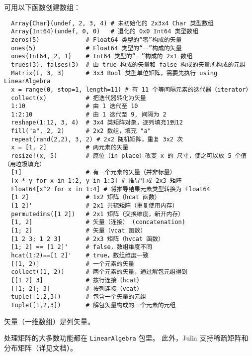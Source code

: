 \documentclass[10pt,a4paper]{article}
\begin{document}
可用以下函数创建数组：
\begin{lstlisting}
  Array{Char}(undef, 2, 3, 4) # 未初始化的 2x3x4 Char 类型数组
  Array{Int64}(undef, 0, 0)   # 退化的 0x0 Int64 类型数组
  zeros(5)             # Float64 类型的“零”构成的矢量
  ones(5)              # Float64 类型的“一”构成的矢量
  ones(Int64, 2, 1)    # Int64 类型的“一”构成的 2x1 数组
  trues(3), falses(3)  # 由 true 构成的矢量和 false 构成的矢量所构成的元组
  Matrix(I, 3, 3)      # 3x3 Bool 类型单位矩阵，需要先执行 using LinearAlgebra
  x = range(0, stop=1, length=11) # 有 11 个等间隔元素的迭代器（iterator）
  collect(x)           # 把迭代器转化为矢量
  1:10                 # 由 1 迭代至 10
  1:2:10               # 由 1 迭代至 9, 间隔为 2
  reshape(1:12, 3, 4)  # 3x4 类矩阵对象，逐列填充1到12
  fill("a", 2, 2)      # 2x2 数组，填充 "a"
  repeat(rand(2,2), 3, 2) # 2x2 随机矩阵，重复 3x2 次
  x = [1, 2]           # 两元素的矢量
  resize!(x, 5)        # 原位（in place）改变 x 的 尺寸，使之可以放 5 个值（用垃圾填充）
  [1]                  # 有一个元素的矢量（并非标量）
  [x * y for x in 1:2, y in 1:3] # 推导生成 2x3 矩阵
  Float64[x^2 for x in 1:4] # 将推导结果元素类型转换为 Float64
  [1 2]                # 1x2 矩阵（hcat 函数）
  [1 2]'               # 2x1 共轭矩阵（重复使用内存）
  permutedims([1 2])   # 2x1 矩阵（交换维度，新开内存）
  [1, 2]               # 矢量（连接） (concatenation)
  [1; 2]               # 矢量（vcat 函数）
  [1 2 3; 1 2 3]       # 2x3 矩阵（hvcat 函数）
  [1; 2] == [1 2]'     # false，数组维度不同
  hcat(1:2)==[1 2]'    # true，数组维度一致
  [(1, 2)]             # 一个元素的矢量
  collect((1, 2))      # 两个元素的矢量，通过解包元组得到
  [[1 2] 3]            # 按行连接（hcat）
  [[1; 2]; 3]          # 按列连接（vcat）
  tuple([1,2,3])       # 包含一个矢量的元组
  Tuple([1,2,3])       # 解包矢量构成的三个元素的元组
\end{lstlisting}
矢量（一维数组）是列矢量。

处理矩阵的大多数功能都在 \lstinline|LinearAlgebra| 包里。
此外，Julia 支持稀疏矩阵和分布矩阵（详见文档）。
\end{document}
